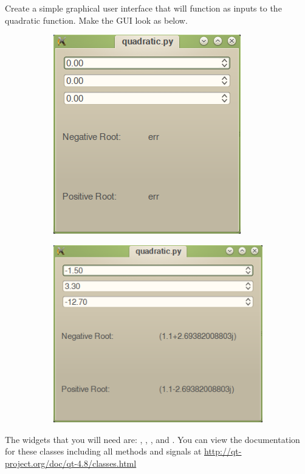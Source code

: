 \begin{problem}
Create a simple graphical user interface that will function as inputs to the quadratic function.
Make the GUI look as below.
\begin{figure}[H]
\centering
\begin{subfigure}[b]{.49\textwidth}
\includegraphics[width=\textwidth]{quadratic_view.png}
\end{subfigure}
\begin{subfigure}[b]{.49\textwidth}
\includegraphics[width=\textwidth]{quadratic_view2.png}
\end{subfigure}
\end{figure}
The widgets that you will need are: , , , and .  You can view the documentation for these classes including all methods and signals at \url{http://qt-project.org/doc/qt-4.8/classes.html}
\end{problem}
